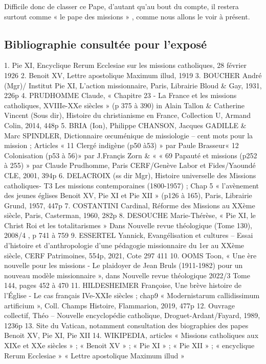 Difficile donc de classer ce Pape, d’autant qu’au bout du compte, il restera surtout comme « le pape des missions » , comme nous allons le voir à présent.

\subsection{Bibliographie consultée pour l’exposé}
 	

1.	Pie XI, Encyclique Rerum Ecclesiae sur les missions catholiques, 28 février 1926
2.	Benoit XV, Lettre apostolique Maximum illud, 1919
3.	BOUCHER André (Mgr)/ Institut Pie XI, L’action missionnaire, Paris, Librairie Bloud & Gay, 1931, 226p
4.	PRUDHOMME Claude, « Chapitre 23 - La France et les missions catholiques, XVIIIe-XXe siècles » (p 375 à 390) in Alain Tallon & Catherine Vincent (Sous dir), Histoire du christianisme en France, Collection U, Armand Colin, 2014, 448p 
5.	BRIA (Ion), Philippe CHANSON, Jacques GADILLE & Marc SPINDLER, Dictionnaire œcuménique de missiologie – cent mots pour la mission ; Articles « 11 Clergé indigène (p50 à53) » par Paule Brasseur« 12 Colonisation (p53 à 56)» par J.Françis Zorn & « « 69 Papauté et missions (p252 à 255) » par Claude Prudhomme, Paris CERF/Genève Labor et Fides/Yaoundé CLE, 2001, 394p
6.	DELACROIX (ss dir Mgr), Histoire universelle des Missions catholiques- T3 Les missions contemporaines (1800-1957) ; Chap 5 « l’avènement des jeunes églises Benoit XV, Pie XI et Pie XII » (p126 à 165), Paris, Librairie Grund, 1957, 447p
7.	COSTANTINI Cardinal, Réforme des Missions au XXème siècle, Paris, Casterman, 1960, 282p
8.	DESOUCHE Marie-Thérèse, « Pie XI, le Christ Roi et les totalitarismes » Dans Nouvelle revue théologique (Tome 130), 2008/4 , p 741 à 759
9.	ESSERTEL Yannick, Evangélisation et cultures – Essai d’histoire et d’anthropologie d’une pédagogie missionnaire du 1er au XXème siècle, CERF Patrimoines, 554p, 2021, Cote 297 411
10.	OOMS Toon, « Une ère nouvelle pour les missions - Le plaidoyer de Jean Bruls (1911-1982) pour un nouveau modèle missionnaire », dans Nouvelle revue théologique 2022/3 Tome 144, pages 452 à 470
11.	HILDESHEIMER Françoise, Une brève histoire de l'Église - Le cas français IVe-XXIe siècles ; chap9 « Modernistarum callidissimum artificium »,  Coll. Champs Histoire, Flammarion, 2019, 477p
12.	Ouvrage collectif, Théo – Nouvelle encyclopédie catholique, Droguet-Ardant/Fayard, 1989, 1236p
13.	Site du Vatican, notamment consultation des biographies des papes Benoit XV, Pie XI, Pie XII
14.	WIKIPEDIA, articles « Missions catholiques aux XIXe et XXe siècles » ; « Benoit XV » ; « Pie XI » ; « Pie XII » ; « encyclique Rerum Ecclesiae » « Lettre apostolique Maximum illud »


